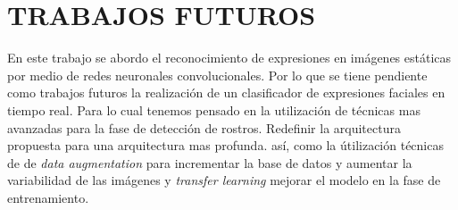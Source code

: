 \chapter*{TRABAJOS FUTUROS}

En este trabajo se abordo el reconocimiento de expresiones en imágenes estáticas por medio de redes neuronales convolucionales. Por lo que se tiene pendiente como trabajos futuros la realización de un clasificador de expresiones faciales en tiempo real. Para lo cual tenemos pensado en la utilización de técnicas mas avanzadas para la fase de detección de rostros. Redefinir la arquitectura propuesta para una arquitectura mas profunda. así, como la útilización técnicas de de \textit{data augmentation} para incrementar la base de datos y aumentar la variabilidad de las imágenes y \textit{transfer learning} mejorar el modelo en la fase de entrenamiento.

